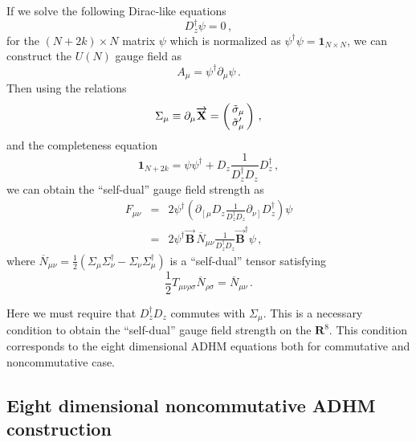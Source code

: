 \documentclass[a4paper,12pt]{article}
\begin{document}
If we solve the following Dirac-like equations
\begin{equation} 
D_z^{\dagger}\psi=0\,,
\end{equation} 
for the $(N+2k)\times N$ matrix $\psi$ which is normalized as 
$\psi^{\dagger}\psi =\mathbf{1}_{N\times N}$, 
we can construct the $U(N)$ gauge field as
\begin{equation}
 A_{\mu}=\psi^{\dagger}\partial_{\mu}\psi\,.
\end{equation}
Then using the relations
\begin{equation}
\Sigma_{\mu}\equiv \partial_{\mu}\overrightarrow{\mathbf{X}}=
\left( \begin{array}{@{\,}c@{\,}}
   \tilde{\sigma}_{\mu} \\
  \tilde{\sigma}'_{\mu}
  \end{array}  \right)\,,
\end{equation}
and the completeness equation
\begin{equation}
\textbf{1}_{N+2k}=\psi\psi^{\dagger}
+D_z\frac{1}{ D^{\dagger}_zD_z}D^{\dagger}_z\,,
\end{equation}
we can obtain the ``self-dual'' gauge field strength as
\begin{eqnarray}
F_{\mu\nu}&=& 2\psi^{\dagger}\left( \partial_{\left[ \mu\right. } D_z
\frac{1}{ D^{\dagger}_zD_z}  \partial_{\left. \nu \right]  }D^{\dagger}_z
\right)\psi\nonumber\\
&=& 2\psi^{\dagger}\overrightarrow{\mathbf{B}}\,
\overline{N}_{\mu\nu}\frac{1}{ D^{\dagger}_zD_z}
\overrightarrow{\mathbf{B}}^{\dagger}\psi\,,
\end{eqnarray}
where $\overline{N}_{\mu\nu}=\frac{1}{2}(\Sigma_{\mu}\Sigma_{\nu}^{\dagger}-
\Sigma_{\nu}\Sigma_{\mu}^{\dagger})$ is a ``self-dual'' tensor satisfying
\begin{equation}
  \frac{1}{2}T_{\mu\nu\rho\sigma}\overline{N}_{\rho\sigma}=
\overline{N}_{\mu\nu}\,.
\end{equation}

Here we must require that  $D^{\dagger}_zD_z$ commutes 
with $\Sigma_{\mu}$.
This is a necessary condition to obtain the ``self-dual'' gauge field strength 
on the $\mathbf{R}^8$. This condition corresponds to the eight dimensional 
ADHM equations both for commutative and noncommutative case.




\subsection{Eight dimensional noncommutative ADHM construction}  
\end{document}
